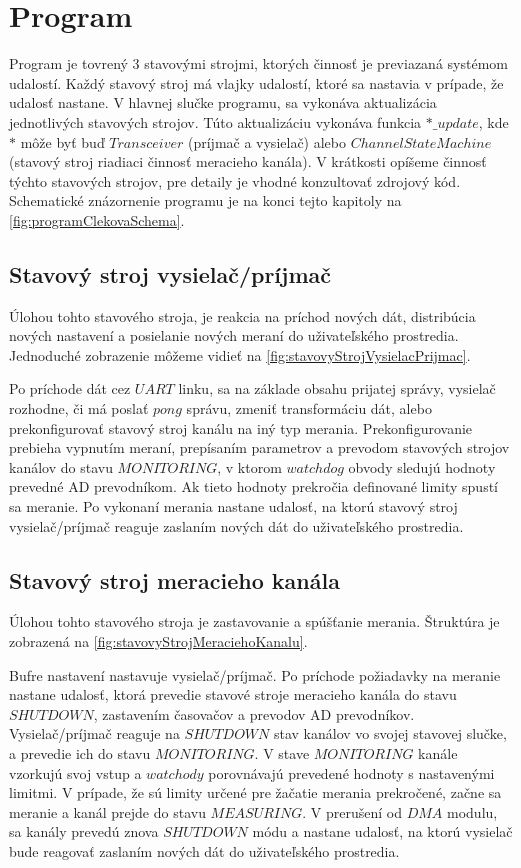 \documentclass[main.tex]{subfiles}
\begin{document}
	\section{Program}
		\begin{multicols*}{2}
			\noindent Program je tovrený 3 stavovými strojmi, ktorých činnosť je previazaná systémom udalostí. Každý stavový stroj má vlajky udalostí, ktoré sa nastavia v prípade, že udalosť nastane. V hlavnej slučke programu, sa vykonáva aktualizácia jednotlivých stavových strojov. Túto aktualizáciu vykonáva funkcia $*\_update$, kde $*$ môže byť buď $Transceiver$ (príjmač a vysielač) alebo $ChannelStateMachine$ (stavový stroj riadiaci činnosť meracieho kanála). V krátkosti opíšeme činnosť týchto stavových strojov, pre detaily je vhodné konzultovať zdrojový kód. Schematické znázornenie programu je na konci tejto kapitoly na \cref{fig:programClekovaSchema}.
			
			\subsection{Stavový stroj vysielač/príjmač}
			Úlohou tohto stavového stroja, je reakcia na príchod nových dát, distribúcia nových nastavení a posielanie nových meraní do uživateľského prostredia. Jednoduché zobrazenie môžeme vidieť na \cref{fig:stavovyStrojVysielacPrijmac}.
			
			Po príchode dát cez $UART$ linku, sa na základe obsahu prijatej správy, vysielač rozhodne, či má poslať $pong$ správu, zmeniť transformáciu dát, alebo prekonfigurovať stavový stroj kanálu na iný typ merania. Prekonfigurovanie prebieha vypnutím meraní, prepísaním parametrov a prevodom stavových strojov kanálov do stavu $MONITORING$, v ktorom $watchdog$ obvody sledujú hodnoty prevedné AD prevodníkom. Ak tieto hodnoty prekročia definované limity spustí sa meranie. Po vykonaní merania nastane udalosť, na ktorú stavový stroj vysielač/príjmač reaguje zaslaním nových dát do uživateľského prostredia.
			
			
			\vskip 0.25cm
			
			\subsection{Stavový stroj meracieho kanála}
			Úlohou tohto stavového stroja je zastavovanie a spúšťanie merania. Štruktúra je zobrazená na \cref{fig:stavovyStrojMeraciehoKanalu}.

			Bufre nastavení nastavuje vysielač/príjmač. Po príchode požiadavky na meranie nastane udalosť, ktorá prevedie stavové stroje meracieho kanála do stavu $SHUTDOWN$, zastavením časovačov a prevodov AD prevodníkov. Vysielač/príjmač reaguje na $SHUTDOWN$ stav kanálov vo svojej stavovej slučke, a prevedie ich do stavu $MONITORING$. V stave $MONITORING$ kanále vzorkujú svoj vstup a $watchody$ porovnávajú prevedené hodnoty s nastavenými limitmi. V prípade, že sú limity určené pre žačatie merania prekročené, začne sa meranie a kanál prejde do stavu $MEASURING$. V prerušení od $DMA$ modulu, sa kanály prevedú znova $SHUTDOWN$ módu a nastane udalosť, na ktorú vysielač bude reagovať zaslaním nových dát do uživateľského prostredia.
			

\end{multicols*}
\end{document}
